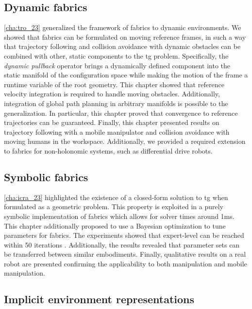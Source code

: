 \subsection{Dynamic fabrics}
\label{sec:conclusion_dynamic_fabrics}

\cref{cha:tro_23} generalized the framework of \ac{fabrics} to dynamic
environments. We showed that \ac{fabrics} can be formulated on moving reference
frames, in such a way that trajectory following and collision avoidance with
dynamic obstacles can be combined with other, static components to the \ac{tg}
problem. Specifically, the \textit{dynamic pullback}
operator brings a dynamically defined component into the static manifold of the
configuration space while making the motion of the frame a runtime variable of
the root geometry. This chapter showed that reference velocity integration is
required to handle moving obstacles. Additionally, integration of global path
planning in arbitrary manifolds is possible to the generalization. In
particular, this chapter proved that convergence to reference trajectories can be 
guaranteed. Finally, this chapter presented results on trajectory following with a
mobile manipulator and collision avoidance with moving humans in the workspace.
Additionally, we provided a required extension to
\ac{fabrics} for non\hyp{}holonomic systems, such as differential
drive robots.

\subsection{Symbolic fabrics}
\label{sec:conclusion_symbolic_fabrics}

\cref{cha:icra_23} highlighted the existence of a
closed-form solution to \ac{tg} when formulated as a geometric problem.
This property is exploited in a purely symbolic implementation of \ac{fabrics}
which allows for solver times around 1ms. This chapter additionally
proposed to use a Bayesian optimization to tune parameters
for \ac{fabrics}.
The experiments showed that expert-level can be reached within 50 iterations
.
Additionally, the results revealed that parameter sets can be transferred between
similar embodiments. Finally, qualitative results on a real robot are presented
confirming the applicability to both manipulation and mobile
manipulation.

\subsection{Implicit environment representations}
\label{sec:conclusion_implicit}


